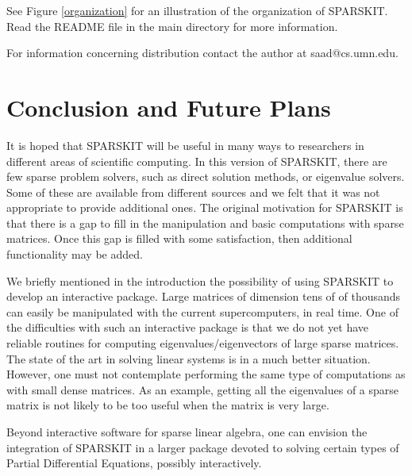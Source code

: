 \documentclass[12pt]{article}
\begin{document}
See Figure \ref{organization} for an illustration of the organization
of SPARSKIT.  Read the README file in the main directory for more
information.


For information concerning distribution contact the author at
saad@cs.umn.edu.

\section{Conclusion and Future Plans}
It is hoped that SPARSKIT will be useful in many 
ways to researchers in different areas of scientific computing.
In this version of SPARSKIT, there are few sparse
problem solvers, such as direct solution methods, or 
eigenvalue solvers. Some of these are available from different
sources and we felt that it was not appropriate to provide
additional ones. The original 
motivation for SPARSKIT is  that there is 
a gap to fill in the manipulation and basic computations
with sparse matrices. Once this gap is filled with some
satisfaction, then additional functionality may be added.

We briefly mentioned in the introduction the possibility of using 
SPARSKIT to develop an interactive package.
Large matrices of dimension tens of of thousands can 
easily be manipulated with the current supercomputers, 
in real time. One of the difficulties
with such an interactive package is that we do not yet
have reliable routines for computing eigenvalues/eigenvectors of
large sparse matrices. The state of the art in solving linear 
systems is in a much better situation. However, one must not 
contemplate performing the same type of computations as with 
small dense matrices. As an example,
getting all the eigenvalues of a sparse matrix is not likely
to be too useful when the matrix is very large.

Beyond interactive software for sparse linear algebra, one can
envision the integration of SPARSKIT in a larger package 
devoted to solving certain types of Partial Differential Equations, 
possibly interactively. 
\end{document}
